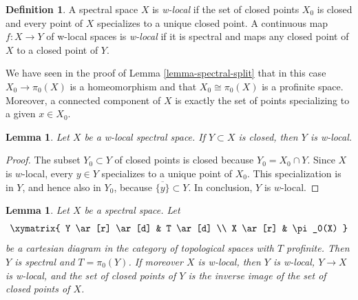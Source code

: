 \documentclass[10pt,a4paper]{article}
\theoremstyle{plain}
\newtheorem{lemma}[subsection]{Lemma}
\theoremstyle{definition}
\newtheorem{definition}[subsection]{Definition}
\theoremstyle{remark}
\numberwithin{equation}{subsection}
\begin{document}
\begin{definition}
\label{definition-w-local}
A spectral space $X$ is {\it w-local} if the set of closed points $X_0$
is closed and every point of $X$ specializes to a unique closed point.
A continuous map $f : X \to Y$ of w-local spaces is {\it w-local}
if it is spectral and maps any closed point of $X$ to a closed point of $Y$.
\end{definition}

\noindent
We have seen in the proof of Lemma \ref{lemma-spectral-split}
that in this case $X_0 \to \pi_0(X)$ is a homeomorphism and that
$X_0 \cong \pi_0(X)$ is a profinite space. Moreover, a connected
component of $X$ is exactly the set of points specializing to
a given $x \in X_0$.

\begin{lemma}
\label{lemma-closed-subspace-w-local}
Let $X$ be a w-local spectral space. If $Y \subset X$ is closed,
then $Y$ is w-local.
\end{lemma}

\begin{proof}
The subset $Y_0 \subset Y$ of closed points is closed because
$Y_0 = X_0 \cap Y$. Since $X$ is $w$-local, every $y \in Y$ specializes
to a unique point of $X_0$. This specialization is in $Y$, and hence
also in $Y_0$, because $\overline{\{y\}}\subset Y$. In conclusion, $Y$
is $w$-local.
\end{proof}

\begin{lemma}
\label{lemma-silly}
Let $X$ be a spectral space. Let
$$
\xymatrix{
Y \ar[r] \ar[d] & T \ar[d] \\
X \ar[r] & \pi_0(X)
}
$$
be a cartesian diagram in the category of topological spaces
with $T$ profinite. Then $Y$ is spectral and $T = \pi_0(Y)$.
If moreover $X$ is w-local, then $Y$ is w-local, $Y \to X$ is w-local,
and the set of closed points of $Y$ is the inverse image of the
set of closed points of $X$.
\end{lemma}
\end{document}
